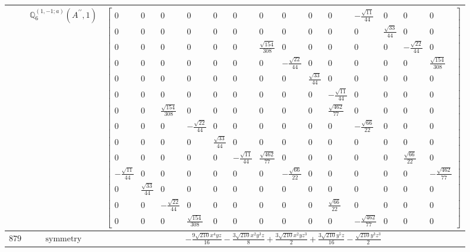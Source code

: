 \documentclass[fleqn,8pt,landscape]{jsarticle}
\begin{document}
\begin{longtable}{ccc}
$  $ & $ \mathbb{Q}_{6}^{(1,-1;a)}(A^{\prime\prime},1) $ & $ \begin{bmatrix} 0 & 0 & 0 & 0 & 0 & 0 & 0 & 0 & 0 & 0 & - \frac{\sqrt{11}}{44} & 0 & 0 & 0 \\ 0 & 0 & 0 & 0 & 0 & 0 & 0 & 0 & 0 & 0 & 0 & \frac{\sqrt{33}}{44} & 0 & 0 \\ 0 & 0 & 0 & 0 & 0 & 0 & \frac{\sqrt{154}}{308} & 0 & 0 & 0 & 0 & 0 & - \frac{\sqrt{22}}{44} & 0 \\ 0 & 0 & 0 & 0 & 0 & 0 & 0 & - \frac{\sqrt{22}}{44} & 0 & 0 & 0 & 0 & 0 & \frac{\sqrt{154}}{308} \\ 0 & 0 & 0 & 0 & 0 & 0 & 0 & 0 & \frac{\sqrt{33}}{44} & 0 & 0 & 0 & 0 & 0 \\ 0 & 0 & 0 & 0 & 0 & 0 & 0 & 0 & 0 & - \frac{\sqrt{11}}{44} & 0 & 0 & 0 & 0 \\ 0 & 0 & \frac{\sqrt{154}}{308} & 0 & 0 & 0 & 0 & 0 & 0 & \frac{\sqrt{462}}{77} & 0 & 0 & 0 & 0 \\ 0 & 0 & 0 & - \frac{\sqrt{22}}{44} & 0 & 0 & 0 & 0 & 0 & 0 & - \frac{\sqrt{66}}{22} & 0 & 0 & 0 \\ 0 & 0 & 0 & 0 & \frac{\sqrt{33}}{44} & 0 & 0 & 0 & 0 & 0 & 0 & 0 & 0 & 0 \\ 0 & 0 & 0 & 0 & 0 & - \frac{\sqrt{11}}{44} & \frac{\sqrt{462}}{77} & 0 & 0 & 0 & 0 & 0 & \frac{\sqrt{66}}{22} & 0 \\ - \frac{\sqrt{11}}{44} & 0 & 0 & 0 & 0 & 0 & 0 & - \frac{\sqrt{66}}{22} & 0 & 0 & 0 & 0 & 0 & - \frac{\sqrt{462}}{77} \\ 0 & \frac{\sqrt{33}}{44} & 0 & 0 & 0 & 0 & 0 & 0 & 0 & 0 & 0 & 0 & 0 & 0 \\ 0 & 0 & - \frac{\sqrt{22}}{44} & 0 & 0 & 0 & 0 & 0 & 0 & \frac{\sqrt{66}}{22} & 0 & 0 & 0 & 0 \\ 0 & 0 & 0 & \frac{\sqrt{154}}{308} & 0 & 0 & 0 & 0 & 0 & 0 & - \frac{\sqrt{462}}{77} & 0 & 0 & 0 \end{bmatrix} $ \\ \hline
$ 879 $ & $ \text{symmetry} $ & $ - \frac{9 \sqrt{210} x^{4} y z}{16} - \frac{3 \sqrt{210} x^{2} y^{3} z}{8} + \frac{3 \sqrt{210} x^{2} y z^{3}}{2} + \frac{3 \sqrt{210} y^{5} z}{16} - \frac{\sqrt{210} y^{3} z^{3}}{2} $ \\

\end{longtable}
\end{document}
